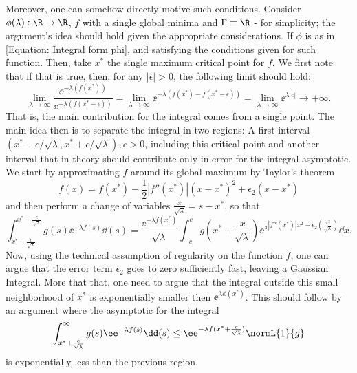 Moreover, one can somehow directly motive such conditions. Consider $\phi(\lambda): \R \rightarrow \R$, $f$ with a single global minima and $\Gamma \equiv \R$ - for simplicity; the argument's idea should hold given the appropriate considerations. If $\phi$ is as in \autoref{Equation: Integral form phi}, and satisfying the conditions given for such function. Then, take $x^*$ the single maximum critical point for $f$. We first note that if that is true, then, for any $|\epsilon| > 0$, the following limit should hold:
\begin{equation}
	\lim_{\lambda \rightarrow \infty} \frac{\ee^{-\lambda(f(x^*))}}{\ee^{-\lambda(f(x^* - \epsilon))}} = \lim_{\lambda \rightarrow \infty} \ee^{-\lambda(f(x^*) - f(x^* - \epsilon))} = \lim_{\lambda \rightarrow \infty} \ee^{\lambda |c|} \rightarrow + \infty. 
\end{equation}
That is, the main contribution for the integral comes from a single point. The main idea then is to separate the integral in two regions: A first interval $(x^* - c/\sqrt{\lambda}, x^* + c/\sqrt{\lambda}), c > 0$, including this critical point and another interval that in theory should contribute only in error for the integral asymptotic. We start by approximating $f$ around its global maximum by Taylor's theorem 
	\begin{equation}
		f(x) = f(x^*) - \frac{1}{2} |f''(x^*)|(x-x^*)^2 + \epsilon_2(x-x^*)
	\end{equation}
	and then perform a change of variables $\frac{x}{\sqrt{\lambda}} = s - x^*$, so that 
	\begin{equation}
		\int_{x^*-\frac{c}{\sqrt{\lambda}}}^{x^*+\frac{c}{\sqrt{\lambda}}} g(s) \ee^{-\lambda f(s)} \dd(s) = \frac{\ee^{-\lambda f(x^*)}}{\sqrt{\lambda}} \int_{-c}^c g\left(x^* + \frac{x}{\sqrt{\lambda}}\right) \ee^{\frac{1}{2} |f''(x^*)|x^2 - \epsilon_2\left(\frac{x^3}{\sqrt{\lambda}}\right)} \dd x.
	\end{equation}
	Now, using the technical assumption of regularity on the function $f$, one can argue that the error term $\epsilon_2$ goes to zero sufficiently fast, leaving a Gaussian Integral. More that that, one need to argue that the integral outside this small neighborhood of $x^*$ is exponentially smaller then $\ee^{\lambda \phi(x^*)}$. This should follow by an argument where the asymptotic for the integral 
	\begin{equation}
			\int_{x^*+ \frac{c}{\sqrt{\lambda}}}^{\infty} g(s) \ee^{-\lambda f(s)} \dd(s) \leq \ee^{-\lambda f(x^*+ \frac{c}{\sqrt{\lambda}})} \normL{1}{g}
	\end{equation}
	is exponentially less than the previous region. 
	
